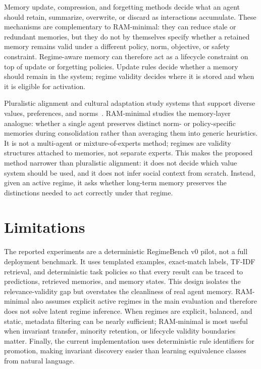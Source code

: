 \documentclass{article} %
\begin{document}
Memory update, compression, and forgetting methods decide what an agent should retain, summarize, overwrite, or discard as interactions accumulate.
These mechanisms are complementary to RAM-minimal: they can reduce stale or redundant memories, but they do not by themselves specify whether a retained memory remains valid under a different policy, norm, objective, or safety constraint.
Regime-aware memory can therefore act as a lifecycle constraint on top of update or forgetting policies.
Update rules decide whether a memory should remain in the system; regime validity decides where it is stored and when it is eligible for activation.

Pluralistic alignment and cultural adaptation study systems that support diverse values, preferences, and norms~\citep{sorensen2024roadmap,culturalpalette2024,valuepluralism2025}.
RAM-minimal studies the memory-layer analogue: whether a single agent preserves distinct norm- or policy-specific memories during consolidation rather than averaging them into generic heuristics.
It is not a multi-agent or mixture-of-experts method; regimes are validity structures attached to memories, not separate experts.
This makes the proposed method narrower than pluralistic alignment: it does not decide which value system should be used, and it does not infer social context from scratch.
Instead, given an active regime, it asks whether long-term memory preserves the distinctions needed to act correctly under that regime.

\section{Limitations}
\label{sec:limitations}

The reported experiments are a deterministic RegimeBench v0 pilot, not a full deployment benchmark.
It uses templated examples, exact-match labels, TF-IDF retrieval, and deterministic task policies so that every result can be traced to predictions, retrieved memories, and memory states.
This design isolates the relevance-validity gap but overstates the cleanliness of real agent memory.
RAM-minimal also assumes explicit active regimes in the main evaluation and therefore does not solve latent regime inference.
When regimes are explicit, balanced, and static, metadata filtering can be nearly sufficient; RAM-minimal is most useful when invariant transfer, minority retention, or lifecycle validity boundaries matter.
Finally, the current implementation uses deterministic rule identifiers for promotion, making invariant discovery easier than learning equivalence classes from natural language.
\end{document}
